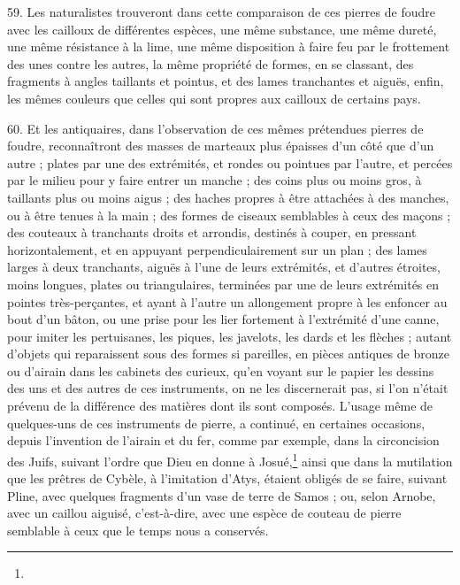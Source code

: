 \documentclass[a4paper, 11pt, oneside, polutonikogreek, french]{article}
\begin{document}
59. Les naturalistes trouveront dans cette comparaison de ces pierres de foudre avec les cailloux de différentes espèces, une même substance, une même dureté, une même résistance à la lime, une même disposition à faire feu par le frottement des unes contre les autres, la même propriété de formes, en se classant, des fragments à angles taillants et pointus, et des lames tranchantes et aiguës, enfin, les mêmes couleurs que celles qui sont propres aux cailloux de certains pays.

60. Et les antiquaires, dans l'observation de ces mêmes prétendues pierres de foudre, reconnaîtront des masses de marteaux plus épaisses d'un côté que d'un autre ; plates par une des extrémités, et rondes ou pointues par l'autre, et percées par le milieu pour y faire entrer un manche ; des coins plus ou moins gros, à taillants plus ou moins aigus ; des haches propres à être attachées à des manches, ou à être tenues à la main ; des formes de ciseaux semblables à ceux des maçons ; des couteaux à tranchants droits et arrondis, destinés à couper, en pressant horizontalement, et en appuyant perpendiculairement sur un plan ; des lames larges à deux tranchants, aiguës à l'une de leurs extrémités, et d'autres étroites, moins longues, plates ou triangulaires, terminées par une de leurs extrémités en pointes très-perçantes, et ayant à l'autre un allongement propre à les enfoncer au bout d'un bâton, ou une prise pour les lier fortement à l'extrémité d'une canne, pour imiter les pertuisanes, les piques, les javelots, les dards et les flèches ; autant d'objets qui reparaissent sous des formes si pareilles, en pièces antiques de bronze ou d'airain dans les cabinets des curieux, qu'en voyant sur le papier les dessins des uns et des autres de ces instruments, on ne les discernerait pas, si l'on n'était prévenu de la différence des matières dont ils sont composés. L'usage même de quelques-uns de ces instruments de pierre, a continué, en certaines occasions, depuis l'invention de l'airain et du fer, comme par exemple, dans la circoncision des Juifs, suivant l'ordre que Dieu en donne à Josué,\footnote{} ainsi que dans la mutilation que les prêtres de Cybèle, à l'imitation d'Atys, étaient obligés de se faire, suivant Pline, avec quelques fragments d'un vase de terre de Samos ; ou, selon Arnobe, avec un caillou aiguisé, c'est-à-dire, avec une espèce de couteau de pierre semblable à ceux que le temps nous a conservés.
\end{document}
